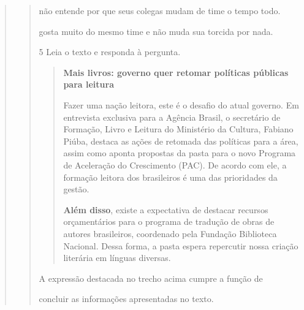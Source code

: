 \begin{escolha}
\begin{escolha}
\begin{escolha}
\begin{quote}
\begin{quote}
{\begin{escolha}
\item não entende por que seus colegas mudam de time o tempo todo.

\item gosta muito do mesmo time e não muda sua torcida por nada.
\end{escolha}


\num{5} Leia o texto e responda à pergunta.

\begin{quote}
\textbf{Mais livros: governo quer retomar políticas públicas para leitura}

Fazer uma nação leitora, este é o desafio do atual governo. Em
entrevista exclusiva para a Agência Brasil, o secretário de Formação,
Livro e Leitura do Ministério da Cultura, Fabiano Piúba, destaca as
ações de retomada das políticas para a área, assim como aponta propostas
da pasta para o novo Programa de Aceleração do Crescimento (PAC). De
acordo com ele, a formação leitora dos brasileiros é uma das prioridades
da gestão.

\textbf{Além disso}, existe a expectativa de destacar recursos orçamentários
para o programa de tradução de obras de autores brasileiros, coordenado
pela Fundação Biblioteca Nacional. Dessa forma, a pasta espera
repercutir nossa criação literária em línguas diversas.
\end{quote}


A expressão destacada no trecho acima cumpre a função de

\begin{escolha}
  \item concluir as informações apresentadas no texto.


\end{escolha}}
\end{quote}
\end{quote}
\end{escolha}
\end{escolha}
\end{escolha}
